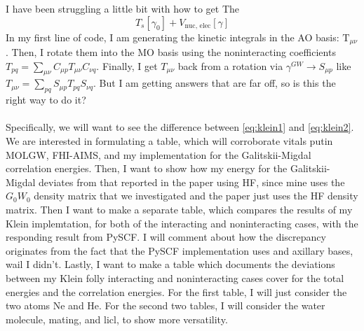 \documentclass[12pt]{article}
\begin{document}
I have been struggling a little bit with how to get The
\begin{equation}
    T_s[\gamma _0] + V_{\text{nuc, elec}} [\gamma]
\end{equation}
In my first line of code, I am generating the kinetic integrals in the AO basis: $\mathrm{T}_{\mu \nu}$. Then, I rotate them into the MO basis using the noninteracting coefficients $T_{pq}=\sum_{\mu \nu} C_{\mu p} T_{\mu \nu} C_{\nu q}$. Finally, I get $T_{\mu \nu}$ back from a rotation via $\gamma ^{GW}\rightarrow S_{\mu p}$ like $T_{\mu \nu} = \sum_{pq} S_{\mu p} T_{pq} S_{\nu q}$. But I am getting answers that are far off, so is this the right way to do it?\\\\
Specifically, we will want to see the difference between \ref{eq:klein1} and \ref{eq:klein2}. 
We are interested in formulating a table, which will corroborate vitals putin MOLGW, FHI-AIMS, and my implementation for the Galitskii-Migdal correlation energies. Then, I want to show how my energy for the Galitskii-Migdal deviates from that reported in the paper using HF, since mine uses the $G_0W_0$ density matrix that we investigated and the paper just uses the HF density matrix.
Then I want to make a separate table, which compares the results of my Klein implemtation, for both of the interacting and noninteracting cases, with the responding result from PySCF. I will comment about how the discrepancy originates from the fact that the PySCF implementation uses and axillary bases, wail I didn't. Lastly, I want to make a table which documents the deviations between my Klein folly interacting and noninteracting cases cover for the total energies and the correlation energies. For the first table, I will just consider the two atoms Ne and He. For the second two tables, I will consider the water molecule, mating, and licl, to show more versatility.
\end{document}

